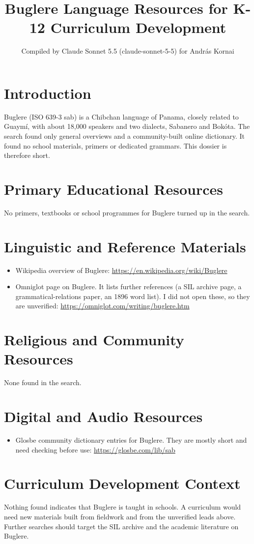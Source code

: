 \documentclass[12pt]{article}
\title{Buglere Language Resources for K-12 Curriculum Development}
\author{Compiled by Claude Sonnet 5.5 (claude-sonnet-5-5) for Andr\'as Kornai}
\date{}
\begin{document}
\maketitle

\section{Introduction}
Buglere (ISO 639-3 sab) is a Chibchan language of Panama, closely related to Guaym\'i, with about 18,000 speakers and two dialects, Sabanero and Bok\'ota. The search found only general overviews and a community-built online dictionary. It found no school materials, primers or dedicated grammars. This dossier is therefore short.

\section{Primary Educational Resources}
No primers, textbooks or school programmes for Buglere turned up in the search.

\section{Linguistic and Reference Materials}
\begin{itemize}
\item Wikipedia overview of Buglere: \url{https://en.wikipedia.org/wiki/Buglere}
\item Omniglot page on Buglere. It lists further references (a SIL archive page, a grammatical-relations paper, an 1896 word list). I did not open these, so they are unverified: \url{https://omniglot.com/writing/buglere.htm}
\end{itemize}

\section{Religious and Community Resources}
None found in the search.

\section{Digital and Audio Resources}
\begin{itemize}
\item Glosbe community dictionary entries for Buglere. They are mostly short and need checking before use: \url{https://glosbe.com/lib/sab}
\end{itemize}

\section{Curriculum Development Context}
Nothing found indicates that Buglere is taught in schools. A curriculum would need new materials built from fieldwork and from the unverified leads above. Further searches should target the SIL archive and the academic literature on Buglere.
\end{document}
